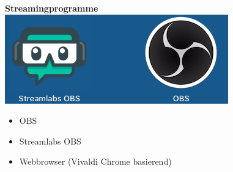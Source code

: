 \begin{center}
  \textbf{Streamingprogramme} \\
  \includegraphics[scale=0.35]{./pictures/streamlabsOBJ.png}
\end{center}



\begin{itemize}
  \item OBS
  \item Streamlabs OBS
  \item Webbrowser (Vivaldi Chrome basierend)
\end{itemize}




%

